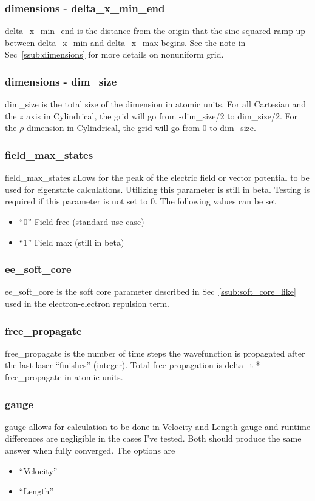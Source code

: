 \documentclass{article}
\begin{document}
\subsubsection{dimensions - delta\_x\_min\_end}
delta\_x\_min\_end is the distance from the origin that the sine squared ramp up between delta\_x\_min and delta\_x\_max begins. See the note in Sec~\ref{ssub:dimensions} for more details on nonuniform grid.

\subsubsection{dimensions - dim\_size}
\label{ssub:dimensions-dim_size}
dim\_size is the total size of the dimension in atomic units. For all Cartesian and the $z$ axis in Cylindrical, the grid will go from -dim\_size/2 to dim\_size/2. For the $\rho$ dimension in Cylindrical, the grid will go from 0 to dim\_size.

\subsubsection{field\_max\_states}
field\_max\_states allows for the peak of the electric field or vector potential to be used for eigenstate calculations. Utilizing this parameter is still in beta. Testing is required if this parameter is not set to 0. The following values can be set
\begin{itemize}
  \item ``0'' Field free (standard use case)
  \item ``1'' Field max (still in beta)
\end{itemize}

\subsubsection{ee\_soft\_core}
ee\_soft\_core is the soft core parameter described in Sec~\ref{ssub:soft_core_like} used in the electron-electron repulsion term.

\subsubsection{free\_propagate}
free\_propagate is the number of time steps the wavefunction is propagated after the last laser ``finishes'' (integer). Total free propagation is delta\_t * free\_propagate in atomic units.

\subsubsection{gauge}
gauge allows for calculation to be done in Velocity and Length gauge and runtime differences are negligible in the cases I've tested. Both should produce the same answer when fully converged. The options are
\begin{itemize}
  \item ``Velocity''
  \item ``Length''
\end{itemize}
\end{document}
